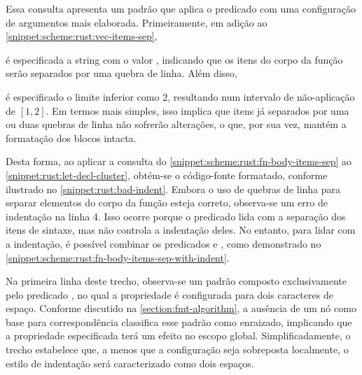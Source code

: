 \documentclass
  [11pt,a4paper,english,brazil,openright,sumario=tradicional,twoside]
  {abntex2}
\begin{document}
{{  Essa consulta apresenta um padrão que aplica o predicado
   com uma configuração de argumentos mais elaborada.
  Primeiramente, em adição ao \cref{snippet:scheme:rust:vec-items-sep},
  \begin{inparaenum}
    \item é especificada a string  com o valor
          , indicando que os itens do corpo da função
          serão separados por uma quebra de linha. Além disso,
    \item é especificado o limite inferior  como 2,
          resultando num intervalo de não-aplicação de $\left[1, 2\right]$.
          Em termos mais simples, isso implica que itens já separados por uma
          ou duas quebras de linha não sofrerão alterações, o que, por sua vez,
          mantém a formatação dos blocos intacta.
  \end{inparaenum}

  Desta forma, ao aplicar a consulta do
  \cref{snippet:scheme:rust:fn-body-items-sep} ao
  \cref{snippet:rust:let-decl-cluster}, obtém-se o código-fonte formatado,
  conforme ilustrado no \cref{snippet:rust:bad-indent}. Embora o uso de quebras
  de linha para separar elementos do corpo da função esteja correto,
  observa-se um erro de indentação na linha 4. Isso ocorre porque o predicado
   lida com a separação dos itens de sintaxe, mas não
  controla a indentação deles. No entanto, para lidar com a indentação, é
  possível combinar os predicados  e
  , como demonstrado no
  \cref{snippet:scheme:rust:fn-body-items-sep-with-indent}.

  Na primeira linha deste trecho, observa-se um padrão composto exclusivamente
  pelo predicado , no qual a propriedade
   é configurada para dois caracteres de
  espaço. Conforme discutido na \cref{section:fmt-algorithm}, a ausência de um
  nó como base para correspondência classifica esse padrão como enraizado,
  implicando que a propriedade especificada terá um efeito no escopo global.
  Simplificadamente, o trecho
   estabelece que, a menos
  que a configuração  seja sobreposta
  localmente, o estilo de indentação será caracterizado como dois espaços.

}}
\end{document}

